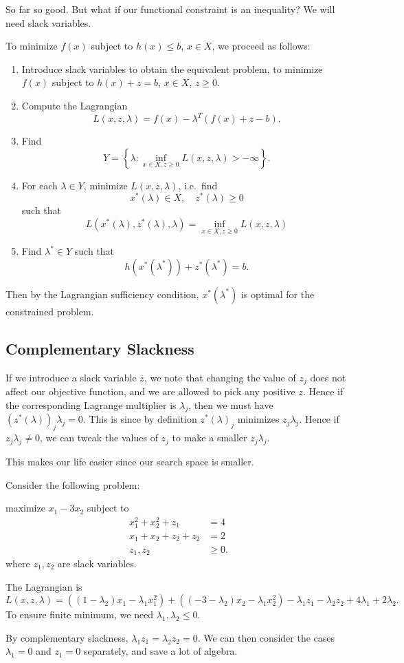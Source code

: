 \documentclass[a4paper]{article}
\begin{document}
So far so good. But what if our functional constraint is an inequality? We will need slack variables.

To minimize $f(x)$ subject to $h(x) \leq b$, $x\in X$, we proceed as follows:
\begin{enumerate}
  \item Introduce slack variables to obtain the equivalent problem, to minimize $f(x)$ subject to $h(x) + z = b$, $x \in X$, $z \geq 0$.
  \item Compute the Lagrangian
    \[
      L(x, z, \lambda) = f(x) - \lambda^T(f(x) + z - b).
    \]
  \item Find
    \[
      Y = \left\{\lambda: \inf_{x\in X, z\geq 0}L(x, z, \lambda) > -\infty\right\}.
    \]
  \item For each $\lambda\in Y$, minimize $L(x, z, \lambda)$, i.e.\ find
    \[
      x^*(\lambda)\in X,\quad z^*(\lambda) \geq 0
    \]
    such that
    \[
      L(x^*(\lambda), z^*(\lambda), \lambda) = \inf_{x\in X, z\geq 0} L(x, z, \lambda)
    \]
  \item Find $\lambda^*\in Y$ such that
    \[
      h(x^*(\lambda^*)) + z^*(\lambda^*) = b.
    \]
\end{enumerate}
Then by the Lagrangian sufficiency condition, $x^*(\lambda^*)$ is optimal for the constrained problem.

\subsection{Complementary Slackness}
If we introduce a slack variable $z$, we note that changing the value of $z_j$ does not affect our objective function, and we are allowed to pick any positive $z$. Hence if the corresponding Lagrange multiplier is $\lambda_j$, then we must have $(z^*(\lambda))_j \lambda_j = 0$. This is since by definition $z^*(\lambda)_j$ minimizes $z_j \lambda_j$. Hence if $z_j \lambda_j \not= 0$, we can tweak the values of $z_j$ to make a smaller $z_j \lambda_j$.

This makes our life easier since our search space is smaller.

\begin{eg}
  Consider the following problem:
  \begin{center}
    maximize $x_1 - 3x_2$ subject to
    \begin{align*}
      x_1^2 + x_2^2 + z_1 &= 4\\
      x_1 + x_2 + z_2 + z_2 &= 2\\
      z_1, z_2 &\geq 0.
    \end{align*}
  where $z_1, z_2$ are slack variables.
  \end{center}
  The Lagrangian is
  \[
    L(x, z, \lambda) = ((1 - \lambda_2)x_1 - \lambda_1 x_1^2) + ((-3 - \lambda_2)x_2 - \lambda_1 x_2^2) - \lambda_1 z_1 - \lambda_2 z_2 + 4\lambda_1 + 2\lambda_2.
  \]
  To ensure finite minimum, we need $\lambda_1, \lambda_2 \leq 0$.

  By complementary slackness, $\lambda_1 z_1 = \lambda_2 z_2 = 0$. We can then consider the cases $\lambda_1 = 0$ and $z_1 = 0$ separately, and save a lot of algebra.
\end{eg}
\end{document}
